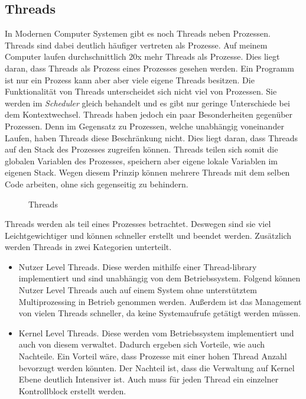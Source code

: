 \subsection{Threads}\label{Threads}
In Modernen Computer Systemen gibt es noch Threads neben Prozessen. Threads sind dabei deutlich häufiger vertreten als Prozesse. Auf meinem Computer laufen durchschnittlich 20x mehr Threads als Prozesse. Dies liegt daran, dass Threads als Prozess eines Prozesses gesehen werden. Ein Programm ist nur ein Prozess kann aber aber viele eigene Threads besitzen. Die Funktionalität von Threads unterscheidet sich nicht viel von Prozessen. Sie werden im \textit{Scheduler} gleich behandelt und es gibt nur geringe Unterschiede bei dem Kontextwechsel.
\medskip
\newline
Threads haben jedoch ein paar Besonderheiten gegenüber Prozessen. Denn im Gegensatz zu Prozessen, welche unabhängig voneinander Laufen, haben Threads diese Beschränkung nicht. Dies liegt daran, dass Threads auf den Stack des Prozesses zugreifen können. Threads teilen sich somit die globalen Variablen des Prozesses, speichern aber eigene lokale Variablen im eigenen Stack. Wegen diesem Prinzip können mehrere Threads mit dem selben Code arbeiten, ohne sich gegenseitig zu behindern.
\begin{figure}[h]
    \centering
    
    \caption{Threads}
\end{figure}
Threads werden als teil eines Prozesses betrachtet. Deswegen sind sie viel Leichtgewichtiger und können schneller erstellt und beendet werden. Zusätzlich werden Threads in zwei Kategorien unterteilt.
\begin{itemize}
    \item Nutzer Level Threads. Diese werden mithilfe einer Thread-library implementiert und sind unabhängig von dem Betriebssystem. Folgend können Nutzer Level Threads auch auf einem System ohne unterstütztem Multiprozessing in Betrieb genommen werden. Außerdem ist das Management von vielen Threads schneller, da keine Systemaufrufe getätigt werden müssen.
    \item Kernel Level Threads. Diese werden vom Betriebssystem implementiert und auch von diesem verwaltet. Dadurch ergeben sich Vorteile, wie auch Nachteile. Ein Vorteil wäre, dass Prozesse mit einer hohen Thread Anzahl bevorzugt werden könnten. Der Nachteil ist, dass die Verwaltung auf Kernel Ebene deutlich Intensiver ist. Auch muss für jeden Thread ein einzelner Kontrollblock erstellt werden. \cite{Threads:Dusey}
\end{itemize}
